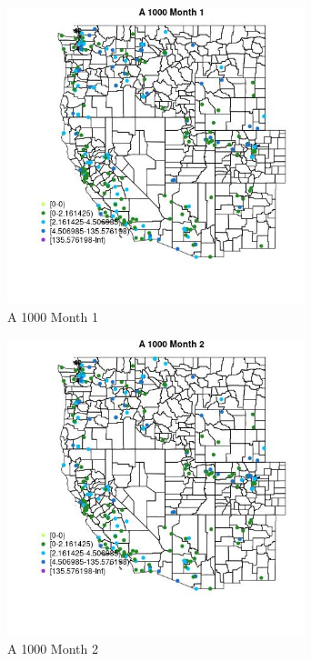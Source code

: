 \begin{figure} 
\centering  
\includegraphics[width=0.77\textwidth]{Code_Outputs/Report_ML_input_PM25_Step4_part_e_de_duplicated_aveswNAs_MapObsMo1A_1000.jpg} 
\caption{\label{fig:Report_ML_input_PM25_Step4_part_e_de_duplicated_aveswNAsMapObsMo1A_1000}A 1000 Month 1} 
\end{figure} 
 

\begin{figure} 
\centering  
\includegraphics[width=0.77\textwidth]{Code_Outputs/Report_ML_input_PM25_Step4_part_e_de_duplicated_aveswNAs_MapObsMo2A_1000.jpg} 
\caption{\label{fig:Report_ML_input_PM25_Step4_part_e_de_duplicated_aveswNAsMapObsMo2A_1000}A 1000 Month 2} 
\end{figure} 
 

